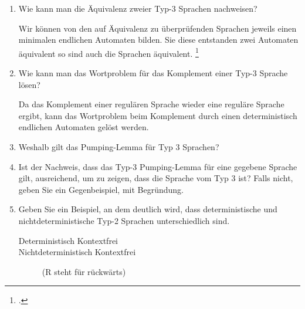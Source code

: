 \documentclass{lehramt-informatik-aufgabe}
\begin{document}
\begin{enumerate}

\item Wie kann man die Äquivalenz zweier Typ-3 Sprachen nachweisen?

\begin{liAntwort}
Wir können von den auf Äquivalenz zu überprüfenden Sprachen jeweils
einen minimalen endlichen Automaten bilden. Sie diese entstanden zwei
Automaten äquivalent so sind auch die Sprachen äquivalent.
\footcite{wiki:aequivalenzproblem}
\end{liAntwort}


\item Wie kann man das Wortproblem für das Komplement einer Typ-3
Sprache lösen?

\begin{liAntwort}
Da das Komplement einer regulären Sprache wieder eine reguläre Sprache
ergibt, kann das Wortproblem beim Komplement durch einen deterministisch
endlichen Automaten gelöst werden.
\end{liAntwort}


\item Weshalb gilt das Pumping-Lemma für Typ 3 Sprachen?


\item Ist der Nachweis, dass das Typ-3 Pumping-Lemma für eine gegebene
Sprache gilt, ausreichend, um zu zeigen, dass die Sprache vom Typ 3 ist?
Falls nicht, geben Sie ein Gegenbeispiel, mit Begründung.


\item Geben Sie ein Beispiel, an dem deutlich wird, dass
deterministische und nichtdeterministische Typ-2 Sprachen
unterschiedlich sind.

\begin{liAntwort}
\begin{description}
\item[Deterministisch Kontextfrei]

\item[Nichtdeterministisch Kontextfrei]
 (R steht für rückwärts)
\end{description}
\end{liAntwort}


\end{enumerate}
\end{document}

